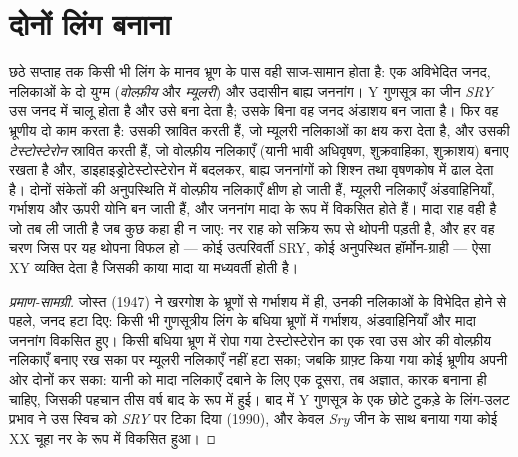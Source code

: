 \section{दोनों लिंग बनाना}

\begin{proposition}[लिंग-निर्धारण और लिंग-विभेदन]\label{prop:b2:mammal-reproduction:sex}
छठे सप्ताह तक किसी भी लिंग के मानव भ्रूण के पास वही साज-सामान होता है:
एक अविभेदित जनद, नलिकाओं के दो युग्म (\emph{वोल्फ़ीय}
और \emph{म्यूलरी}) और उदासीन बाह्य जननांग। Y गुणसूत्र का जीन
\emph{SRY} उस जनद में चालू होता है और उसे
 बना देता है; उसके बिना वह जनद अंडाशय बन जाता है। फिर वह भ्रूणीय
 दो काम करता है: उसकी 
\emph{} स्रावित करती हैं, जो म्यूलरी नलिकाओं का
क्षय करा देता है, और उसकी  \emph{टेस्टोस्टेरोन} स्रावित
करती हैं, जो वोल्फ़ीय नलिकाएँ (यानी भावी अधिवृषण, शुक्रवाहिका,
शुक्राशय) बनाए रखता है और, डाइहाइड्रोटेस्टोस्टेरोन में बदलकर, बाह्य
जननांगों को शिश्न तथा वृषणकोष में ढाल देता है। दोनों संकेतों की
अनुपस्थिति में वोल्फ़ीय नलिकाएँ क्षीण हो जाती हैं, म्यूलरी नलिकाएँ
अंडवाहिनियाँ, गर्भाशय और ऊपरी योनि बन जाती हैं, और जननांग
मादा के रूप में विकसित होते हैं। मादा राह वही है जो तब ली जाती है जब कुछ
कहा ही न जाए: नर राह  को सक्रिय रूप से थोपनी पड़ती है, और हर वह चरण
जिस पर यह थोपना विफल हो --- कोई उत्परिवर्ती SRY, कोई अनुपस्थित
हॉर्मोन-ग्राही --- ऐसा XY व्यक्ति देता है जिसकी काया मादा या मध्यवर्ती
होती है।
\end{proposition}
\begin{proof}[प्रमाण-सामग्री]
जोस्त (1947) ने खरगोश के भ्रूणों से गर्भाशय में ही, उनकी नलिकाओं के
विभेदित होने से पहले, जनद हटा दिए: किसी भी गुणसूत्रीय लिंग के बधिया
भ्रूणों में गर्भाशय, अंडवाहिनियाँ और मादा जननांग विकसित हुए।
किसी बधिया भ्रूण में रोपा गया टेस्टोस्टेरोन का एक रवा उस ओर की
वोल्फ़ीय नलिकाएँ बनाए रख सका पर म्यूलरी नलिकाएँ नहीं हटा सका; जबकि
ग्राफ़्ट किया गया कोई भ्रूणीय  अपनी ओर दोनों कर सका:
यानी  को मादा नलिकाएँ दबाने के लिए एक दूसरा, तब अज्ञात, कारक बनाना
ही चाहिए, जिसकी पहचान तीस वर्ष बाद  के रूप में हुई। बाद में Y गुणसूत्र के एक छोटे टुकड़े के
लिंग-उलट प्रभाव ने उस स्विच को \emph{SRY} पर टिका दिया (1990), और
केवल \emph{Sry} जीन के साथ बनाया गया कोई XX चूहा नर के रूप में विकसित हुआ।
\end{proof}


